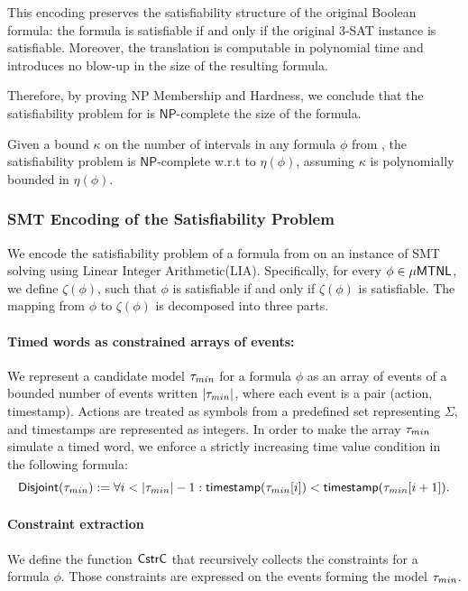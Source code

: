\begin{proofsketch}
This encoding preserves the satisfiability structure of the original Boolean formula: the \TDDLfm formula is satisfiable if and only if the original 3-SAT instance is satisfiable. Moreover, the translation is computable in polynomial time and introduces no blow-up in the size of the resulting formula.

    Therefore, by proving NP Membership and Hardness, we conclude that the satisfiability problem for \TDDLfm is $\mathsf{NP}$-complete   the size of the formula.
\end{proofsketch}

\begin{corollary}
Given a bound $\kappa$ on the number of intervals in any formula $\phi$ from \TDDLfm, the satisfiability problem is $\mathsf{NP}$-complete w.r.t to $\eta(\phi)$, assuming $\kappa$ is polynomially bounded in $\eta(\phi)$.
\end{corollary}

\subsubsection{SMT Encoding of the Satisfiability Problem}
We encode the satisfiability problem of a formula from \TDDLfm on an instance of SMT solving using Linear Integer Arithmetic(LIA). Specifically, for every $\phi \in \mathsf{\mu MTNL}$, we define $\zeta(\phi)$, such that $\phi$ is satisfiable if and only if $\zeta(\phi)$ is satisfiable.
The mapping from $\phi$ to $\zeta(\phi)$ is decomposed into three parts.
\paragraph{Timed words as constrained arrays of events:}
We represent a candidate model $\tau_{min}$ for a formula $\phi$ as an array of events of a bounded number of events written $\vert \tau_{min}\vert$, where each event is a pair (action, timestamp). Actions are treated as symbols from a predefined set representing $\Sigma$, and timestamps are represented as integers. In order to make the array $\tau_{min}$ simulate a timed word, we enforce a strictly increasing time value condition in the following formula:
\[
{\mathsf{Disjoint}}(\tau_{min}):=\forall i <\vert \tau_{min}\vert-1: {\mathsf{timestamp}}(\tau_{min}[i]) < {\mathsf{timestamp}}(\tau_{min}[i+1]).
\]

\paragraph{Constraint extraction}
We define the function $\mathsf{CstrC}$ that recursively collects the constraints for a formula $\phi$. Those constraints are expressed on the events forming the model $\tau_{min}$.



